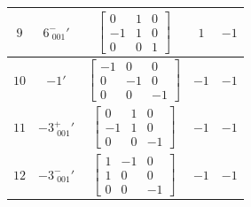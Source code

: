\documentclass[fleqn,8pt]{jsarticle}
\begin{document}
\begin{longtable}{ccccc}
$ 9 $ & $ 6^{-}_{\,\,001}{}' $ & $ \begin{bmatrix} 0 & 1 & 0 \\ -1 & 1 & 0 \\ 0 & 0 & 1 \end{bmatrix} $ & $ 1 $ & $ -1 $ \\ \hline
$ 10 $ & $ -1{}' $ & $ \begin{bmatrix} -1 & 0 & 0 \\ 0 & -1 & 0 \\ 0 & 0 & -1 \end{bmatrix} $ & $ -1 $ & $ -1 $ \\ \hline
$ 11 $ & $ -3^{+}_{\,\,001}{}' $ & $ \begin{bmatrix} 0 & 1 & 0 \\ -1 & 1 & 0 \\ 0 & 0 & -1 \end{bmatrix} $ & $ -1 $ & $ -1 $ \\ \hline
$ 12 $ & $ -3^{-}_{\,\,001}{}' $ & $ \begin{bmatrix} 1 & -1 & 0 \\ 1 & 0 & 0 \\ 0 & 0 & -1 \end{bmatrix} $ & $ -1 $ & $ -1 $ \\
\end{longtable}
\end{document}
